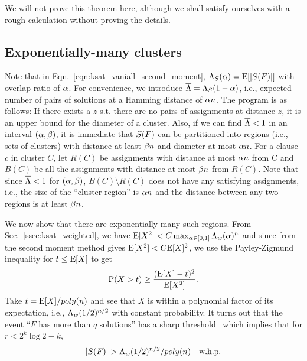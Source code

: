 \documentclass[letterpaper, 10pt, twocolumn, reqno]{amsart}
\begin{document}
We will not prove this theorem here, although we shall satisfy ourselves with a rough calculation without proving the details.

\subsection{Exponentially-many clusters}
\label{ssec:exp_many_clusters}
Note that in Eqn.~\eqref{eqn:ksat_vaniall_second_moment}, $\L_S(\a) = \E[\abs{\sf}]$ with overlap ratio of $\a$. For convenience, we introduce $\bL = \L_S(1-\a)$, i.e., expected number of pairs of solutions at a Hamming distance of $\a n$. The program is as follows: If there exists a $z$ s.t. there are no pairs of assignments at distance $z$, it is an upper bound for the diameter of a cluster. Also, if we can find $\bL <1$ in an interval $(\a, \b)$, it is immediate that $\sf$ can be partitioned into regions (i.e., sets of clusters) with distance at least $\b n$ and diameter at most $\a n$. For a clause $c$ in cluster $C$, let $R(C)$ be assignments with distance at most $\a n$ from C and $B(C)$ be all the assignments with distance at most $\b n$ from $R(C)$. Note that since $\bL < 1$ for $(\a, \b)$, $B(C) \setminus R(C)$ does not have any satisfying assignments, i.e., the size of the ``cluster region'' is $\a n$ and the distance between any two regions is at least $\b n$.

We now show that there are exponentially-many such regions. From Sec.~\ref{ssec:ksat_weighted}, we have $\E[X^2] < C \max_{\a \in [0,1]} \L_w(\a)^n$ and since from the second moment method gives $\E[X^2] < C \E[X]^2$, we use the Payley-Zigmund inequality for $t \leq \E[X]$ to get
$$
\P(X > t) \geq \f{(\E[X]-t)^2}{\E[X^2]}.
$$
Take $t = \E[X]/poly(n)$ and see that $X$ is within a polynomial factor of its expectation, i.e., $\L_w(1/2)^{n/2}$ with constant probability. It turns out that the event ``$F$ has more than $q$ solutions'' has a sharp threshold~\cite{achlioptas2008algorithmic} which implies that for $r < 2^k \log 2 - k$,
$$\abs{\sf} > \L_w(1/2)^{n/2}/poly(n) \quad \trm{w.h.p.}$$
\end{document}
